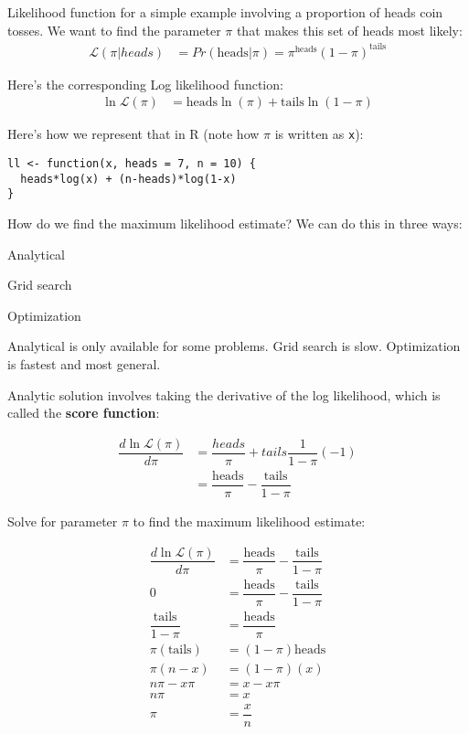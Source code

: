 \documentclass[a4paper,12pt]{article}
\newcommand{\lik}{\mathcal{L}}
\begin{document}
Likelihood function for a simple example involving a proportion of heads coin tosses. We want to find the parameter $\pi$ that makes this set of heads most likely:
\begin{align*}
\lik(\pi|heads) & = Pr(\text{heads}|\pi) = \pi^\text{heads}(1-\pi)^{\text{tails}}
\end{align*}

Here's the corresponding Log likelihood function:
\begin{align*}
\ln\lik(\pi) & = \text{heads}\ln(\pi) + \text{tails}\ln(1-\pi)
\end{align*}

Here's how we represent that in R (note how $\pi$ is written as \texttt{x}):

\begin{lstlisting}
ll <- function(x, heads = 7, n = 10) {
  heads*log(x) + (n-heads)*log(1-x)
}
\end{lstlisting}

How do we find the maximum likelihood estimate? We can do this in three ways:

\begin{itemize*}
\item Analytical
\item Grid search
\item Optimization
\end{itemize*}

Analytical is only available for some problems. Grid search is slow. Optimization is fastest and most general. 


Analytic solution involves taking the derivative of the log likelihood, which is called the \textbf{score function}:

\begin{align*}
\dfrac{d\ln \lik(\pi)}{d\pi} & = \dfrac{heads}{\pi} + tails \dfrac{1}{1-\pi}(-1)\\
& = \dfrac{\text{heads}}{\pi} - \dfrac{\text{tails}}{1-\pi}
\end{align*}

Solve for parameter $\pi$ to find the maximum likelihood estimate:

\begin{align*}
\dfrac{d\ln \lik(\pi)}{d\pi} & = \dfrac{\text{heads}}{\pi} - \dfrac{\text{tails}}{1-\pi}\\
0 & = \dfrac{\text{heads}}{\pi} - \dfrac{\text{tails}}{1-\pi}\\
\dfrac{\text{tails}}{1-\pi} & = \dfrac{\text{heads}}{\pi}\\
\pi(\text{tails}) & = (1-\pi)\text{heads}\\
\pi(n - x) & = (1-\pi)(x)\\
n\pi - x\pi & = x - x\pi\\
n\pi & = x\\
\pi & = \dfrac{x}{n}
\end{align*}
\end{document}

